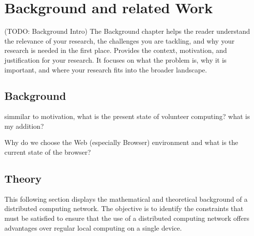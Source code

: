 \chapter{Background and related Work}
\label{ch:background}
(TODO: Background Intro)
The Background chapter helps the reader understand the relevance of your research, the challenges you are tackling, and why your research is needed in the first place.
Provides the context, motivation, and justification for your research. It focuses on what the problem is, why it is important, and where your research fits into the broader landscape.

\section{Background}
\label{sec:background:background}
simmilar to motivation, what is the present state of volunteer computing? what is my addition?

Why do we choose the Web (especially Browser) environment and what is the current state of the browser?

\section{Theory}
\label{sec:background:theory}
This following section displays the mathematical and theoretical background of a distributed computing network. The objective is to identify the constraints that must be satisfied to ensure that the use of a distributed computing network offers advantages over regular local computing on a single device.

